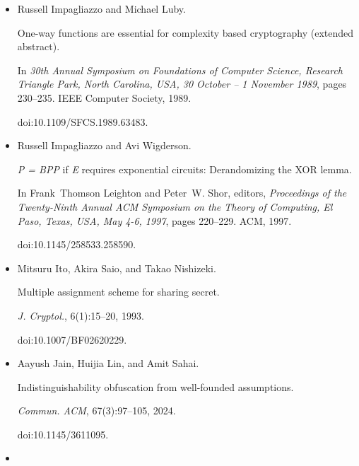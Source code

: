 \documentclass[10pt,a4paper]{article}
\begin{document}
\begin{itemize}
doi:10.1109/FSCS.1990.89604.





\item[] 
[25]

Russell Impagliazzo and Michael Luby.


One-way functions are essential for complexity based cryptography
(extended abstract).


In \emph{30th Annual Symposium on Foundations of Computer Science,
Research Triangle Park, North Carolina, USA, 30 October – 1 November 1989},
pages 230–235. IEEE Computer Society, 1989.


doi:10.1109/SFCS.1989.63483.





\item[] 
[26]

Russell Impagliazzo and Avi Wigderson.


\emph{P = BPP} if \emph{E} requires exponential circuits:
Derandomizing the XOR lemma.


In Frank Thomson Leighton and Peter W. Shor, editors, \emph{Proceedings of the Twenty-Ninth Annual ACM Symposium on the Theory of
Computing, El Paso, Texas, USA, May 4-6, 1997}, pages 220–229. ACM, 1997.


doi:10.1145/258533.258590.





\item[] 
[27]

Mitsuru Ito, Akira Saio, and Takao Nishizeki.


Multiple assignment scheme for sharing secret.


\emph{J. Cryptol.}, 6(1):15–20, 1993.


doi:10.1007/BF02620229.





\item[] 
[28]

Aayush Jain, Huijia Lin, and Amit Sahai.


Indistinguishability obfuscation from well-founded assumptions.


\emph{Commun. ACM}, 67(3):97–105, 2024.


doi:10.1145/3611095.





\item[] 
[29]


\end{itemize}
\end{document}
